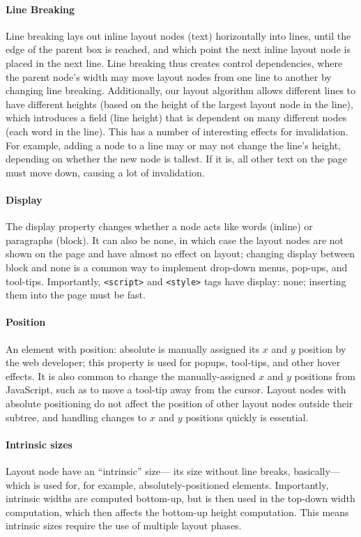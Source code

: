 \paragraph{Line Breaking}
Line breaking lays out inline layout nodes (text)
  horizontally into lines,
  until the edge of the parent box is reached,
  and which point the next inline layout node is placed
  in the next line.
Line breaking thus creates control dependencies,
  where the parent node's width may move layout nodes
  from one line to another by changing line breaking.
Additionally, our layout algorithm
  allows different lines to have different heights
  (based on the height of the largest layout node in the line),
  which introduces a field (line height)
  that is dependent on many different nodes (each word in the line).
This has a number of interesting effects for invalidation.
For example, adding a node to a line
  may or may not change the line's height,
  depending on whether the new node is tallest.
If it is, all other text on the page must move down,
  causing a lot of invalidation.

\paragraph{Display}
The \textsf{display} property changes
  whether a node acts like words (\textsf{inline})
  or paragraphs (\textsf{block}).
It can also be \textsf{none},
  in which case the layout nodes are not shown on the page
  and have almost no effect on layout;
  changing \textsf{display} between \textsf{block} and \textsf{none}
  is a common way to implement drop-down menus, pop-ups, and tool-tips.
Importantly, \texttt{<script>} and \texttt{<style>} tags
  have \textsf{display: none}; inserting them into the page must be fast.

\paragraph{Position}
An element with \textsf{position: absolute}
  is manually assigned its $x$ and $y$ position by the web developer;
  this property is used for popups, tool-tips, and other hover effects.
It is also common
  to change the manually-assigned $x$ and $y$ positions
  from JavaScript, such as to move a tool-tip away from the cursor.
Layout nodes with absolute positioning do not affect
  the position of other layout nodes outside their subtree,
  and handling changes to $x$ and $y$ positions quickly is essential.

\paragraph{Intrinsic sizes}
Layout node have an ``intrinsic'' size---%
  its size without line breaks, basically---%
  which is used for, for example, absolutely-positioned elements.
Importantly, intrinsic widths are computed bottom-up,
  but is then used in the top-down width computation,
  which then affects the bottom-up height computation.
This means intrinsic sizes require the use of
  multiple layout phases.

